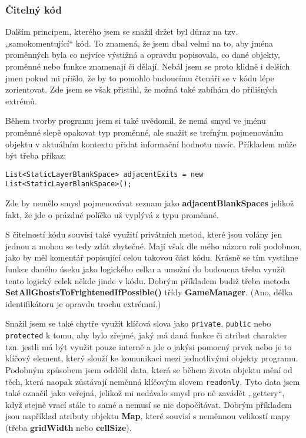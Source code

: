 \documentclass[a4]{article}
\begin{document}
\subsubsection{Čitelný kód}
Dalším principem, kterého jsem se snažil držet byl důraz na tzv. „samokomentující“ kód. To znamená, že jsem dbal velmi na to, aby jména proměnných byla co nejvíce výstižná a opravdu popisovala, co dané objekty, proměnné nebo funkce znamenají či dělají. Nebál jsem se proto klidně i delších jmen pokud mi přišlo, že by to pomohlo budoucímu čtenáři se v kódu lépe zorientovat. Zde jsem se však přistihl, že možná také zabíhám do přílišných extrémů.

Během tvorby programu jsem si také uvědomil, že nemá smysl ve jménu proměnné slepě opakovat typ proměnné, ale snažit se trefným pojmenováním objektu v aktuálním kontextu přidat informační hodnotu navíc. Příkladem může být třeba příkaz: 

\verb|List<StaticLayerBlankSpace> adjacentExits = new List<StaticLayerBlankSpace>();|

Zde by nemělo smysl pojmenovávat seznam jako \textbf{adjacentBlankSpaces} jelikož fakt, že jde o prázdné políčko už vyplývá z typu proměnné.

S čitelností kódu souvisí také využití privátních metod, které jsou volány jen jednou a mohou se tedy zdát zbytečné. Mají však dle mého názoru roli podobnou, jako by měl komentář popisující celou takovou část kódu. Krásně se tím vystihne funkce daného úseku jako logického celku a umožní do budoucna třeba využít tento logický celek někde jinde v kódu. Dobrým příkladem budiž třeba metoda \textbf{SetAllGhostsToFrightenedIfPossible()} třídy \textbf{GameManager}. (Ano, délka identifikátoru je opravdu trochu extrémní.)

Snažil jsem se také chytře využít klíčová slova jako \verb|private|, \verb|public| nebo \verb|protected| k tomu, aby bylo zřejmé, jaký má daná funkce či atribut charakter tzn. jestli má být využit pouze interně a jde o jakýsi pomocný prvek nebo je to klíčový element, který slouží ke komunikaci mezi jednotlivými objekty programu. Podobným způsobem jsem oddělil data, která se během života objektu mění od těch, která naopak zůstávají neměnná klíčovým slovem \verb|readonly|. Tyto data jsem také označil jako veřejná, jelikož mi nedávalo smysl pro ně zavádět „gettery“, když stejně vrací stále to samé a nemusí se nic dopočítávat. Dobrým příkladem jsou například atributy objektu \textbf{Map}, které souvisí s neměnnou velikostí mapy (třeba \textbf{gridWidth} nebo \textbf{cellSize}).
\end{document}

